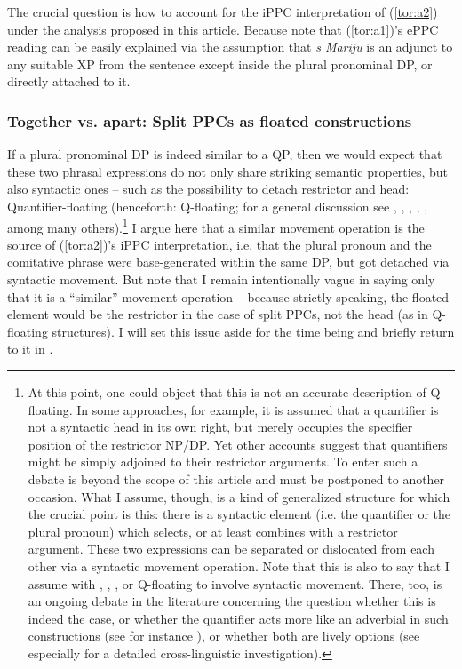 \documentclass[output=paper,colorlinks,citecolor=brown]{langscibook}
\begin{document}
\noindent The crucial question is how to account for the iPPC interpretation of (\ref{tor:a2}) under the analysis proposed in this article. Because note that (\ref{tor:a1})'s ePPC reading can be easily explained via the assumption that \textit{s Mariju} is an adjunct to any suitable XP from the sentence except inside the plural pronominal DP, or directly attached to it. 



\subsubsection{Together vs. apart: Split PPCs as floated constructions}\label{sec:qfloat}
If a plural pronominal DP is indeed similar to a QP, then we would expect that these two phrasal expressions do not only share striking semantic properties, but also syntactic ones -- such as the possibility to detach restrictor and head: Quantifier-floating (henceforth: Q-floating; for a general discussion see \cite{Sportiche1988}, \cite{Shlonsky1991}, \cite{Merchant1996}, \cite{Boskovic2004}, \cite{Fitzpatrick2006}, among many others).\footnote{At this point, one could object that this is not an accurate description of Q-floating. In some approaches, for example, it is assumed that a quantifier is not a syntactic head in its own right, but merely occupies the specifier position of the restrictor NP/DP. Yet other accounts suggest that quantifiers might be simply adjoined to their restrictor arguments. To enter such a debate is beyond the scope of this article and must be postponed to another occasion. What I assume, though, is a kind of generalized structure for which the crucial point is this: there is a syntactic element (i.e. the quantifier or the plural pronoun) which selects, or at least combines with a restrictor argument. These two expressions can be separated or dislocated from each other via a syntactic movement operation. Note that this is also to say that I assume with \citet{Sportiche1988}, \citet{Shlonsky1991}, \citet{Merchant1996}, or \citet{Boskovic2004} Q-floating to involve syntactic movement. There, too, is an ongoing debate in the literature concerning the question whether this is indeed the case, or whether the quantifier acts more like an adverbial in such constructions (see for instance \cite{Bobaljik1998}), or whether both are lively options (see especially \cite{Fitzpatrick2006} for a detailed cross-linguistic investigation).} I argue here that a similar movement operation is the source of (\ref{tor:a2})'s iPPC interpretation, i.e. that the plural pronoun and the comitative phrase were base-generated within the same DP, but got detached via syntactic movement. But note that I remain intentionally vague in saying only that it is a ``similar'' movement operation -- because strictly speaking, the floated element would be the restrictor in the case of split PPCs, not the head (as in Q-floating structures). I will set this issue aside for the time being and briefly return to it in .
\end{document}
